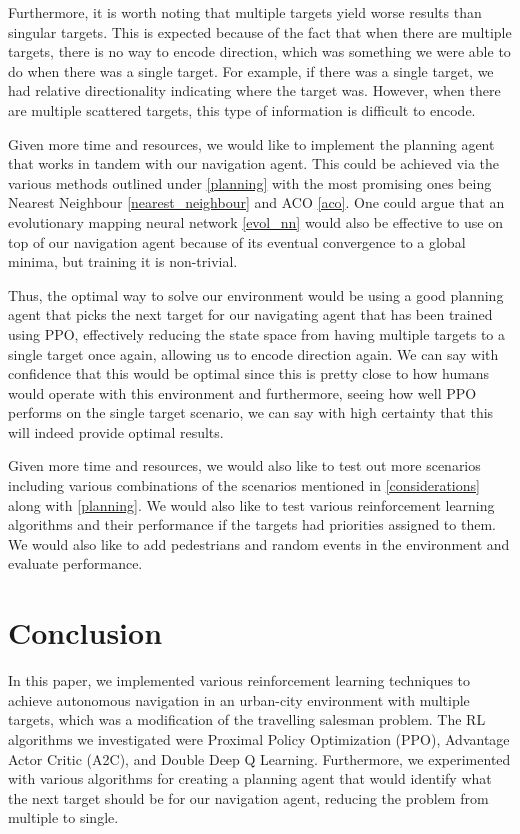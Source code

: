 \documentclass{article}
\begin{document}
	Furthermore, it is worth noting that multiple targets yield worse results than singular targets. This is expected because of the fact that when there are multiple targets, there is no way to encode direction, which was something we were able to do when there was a single target. For example, if there was a single target, we had relative directionality indicating where the target was. However, when there are multiple scattered targets, this type of information is difficult to encode. 
	
	Given more time and resources, we would like to implement the planning agent that works in tandem with our navigation agent. This could be achieved via the various methods outlined under \ref{planning} with the most promising ones being Nearest Neighbour \ref{nearest_neighbour} and ACO \ref{aco}. One could argue that an evolutionary mapping neural network \ref{evol_nn} would also be effective to use on top of our navigation agent because of its eventual convergence to a global minima, but training it is non-trivial.
	
	Thus, the optimal way to solve our environment would be using a good planning agent that picks the next target for our navigating agent that has been trained using PPO, effectively reducing the state space from having multiple targets to a single target once again, allowing us to encode direction again. We can say with confidence that this would be optimal since this is pretty close to how humans would operate with this environment and furthermore, seeing how well PPO performs on the single target scenario, we can say with high certainty that this will indeed provide optimal results.
	
	Given more time and resources, we would also like to test out more scenarios including various combinations of the scenarios mentioned in \ref{considerations} along with \ref{planning}. We would also like to test various reinforcement learning algorithms and their performance if the targets had priorities assigned to them. We would also like to add pedestrians and random events in the environment and evaluate performance.
	
	\section{Conclusion}
	In this paper, we implemented various reinforcement learning techniques to achieve autonomous navigation in an urban-city environment with multiple targets, which was a modification of the travelling salesman problem. The RL algorithms we investigated were Proximal Policy Optimization (PPO), Advantage Actor Critic (A2C), and Double Deep Q Learning. Furthermore, we experimented with various algorithms for creating a planning agent that would identify what the next target should be for our navigation agent, reducing the problem from multiple to single.
	
\end{document}

